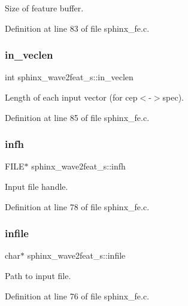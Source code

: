 Size of feature buffer. 



Definition at line 83 of file sphinx\+\_\+fe.\+c.

\mbox{\label{structsphinx__wave2feat__s_a3410a9e0c05c0057f31452550fb5380a}} 
\subsubsection{in\+\_\+veclen}
{\footnotesize\ttfamily int sphinx\+\_\+wave2feat\+\_\+s\+::in\+\_\+veclen}



Length of each input vector (for cep$<$-\/$>$spec). 



Definition at line 85 of file sphinx\+\_\+fe.\+c.

\mbox{\label{structsphinx__wave2feat__s_ad86834e597d4677aed93e7c06cebccb7}} 
\subsubsection{infh}
{\footnotesize\ttfamily F\+I\+LE$\ast$ sphinx\+\_\+wave2feat\+\_\+s\+::infh}



Input file handle. 



Definition at line 78 of file sphinx\+\_\+fe.\+c.

\mbox{\label{structsphinx__wave2feat__s_a6d4d1b1be4e3a3c1de82943e9e6fa65c}} 
\subsubsection{infile}
{\footnotesize\ttfamily char$\ast$ sphinx\+\_\+wave2feat\+\_\+s\+::infile}



Path to input file. 



Definition at line 76 of file sphinx\+\_\+fe.\+c.

